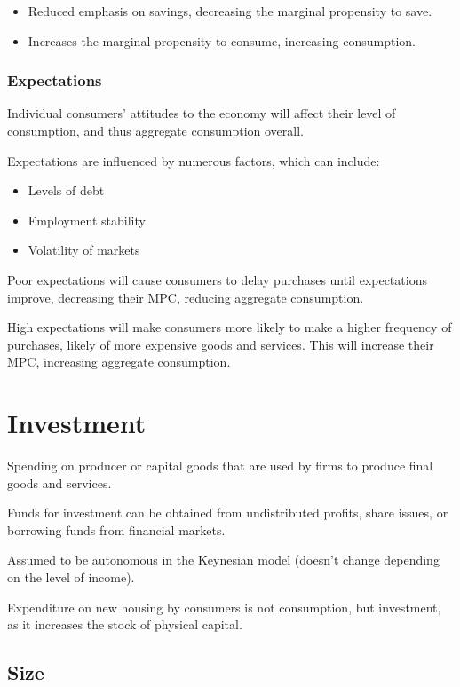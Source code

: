 \documentclass[a4paper,11pt]{article}
\begin{document}
\begin{itemize}
\item Reduced emphasis on savings, decreasing the marginal propensity to save.
\item Increases the marginal propensity to consume, increasing consumption.
\end{itemize}


\subsubsection{Expectations}

Individual consumers' attitudes to the economy will affect their level of
consumption, and thus aggregate consumption overall.

Expectations are influenced by numerous factors, which can include:

\begin{itemize}
\item Levels of debt
\item Employment stability
\item Volatility of markets
\end{itemize}

Poor expectations will cause consumers to delay purchases until expectations
improve, decreasing their MPC, reducing aggregate consumption.

High expectations will make consumers more likely to make a higher frequency of
purchases, likely of more expensive goods and services. This will increase their
MPC, increasing aggregate consumption.




\section{Investment}

Spending on producer or capital goods that are used by firms to produce final
goods and services.

Funds for investment can be obtained from undistributed profits, share issues,
or borrowing funds from financial markets.

Assumed to be autonomous in the Keynesian model (doesn't change depending on
the level of income).

Expenditure on new housing by consumers is not consumption, but investment,
as it increases the stock of physical capital.


\subsection{Size}
\end{document}
